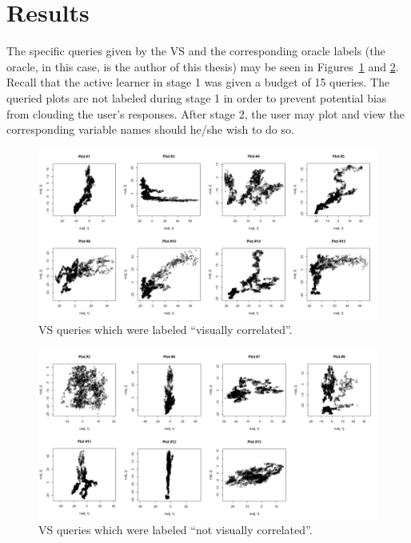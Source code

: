 \section{Results}
\label{sec:usage:results}

The specific queries given by the VS and the corresponding oracle labels 
(the oracle, in this case, is the author of this thesis) may be seen in 
Figures~\ref{fig:usage:interesting} and \ref{fig:usage:notinteresting}. Recall 
that the active learner in stage 1 was given a budget of 15 queries. The 
queried plots are not labeled during stage 1 in order to prevent potential bias 
from clouding the user's responses. After stage 2, the user may plot and view 
the corresponding variable names should he/she wish to do so.
 
\begin{figure}[htb]
	\begin{center}
		\includegraphics[width=1\linewidth]{ch-usage/figures/y_all}
		\caption[VS queries which were labeled ``visually correlated''.]{VS 
		queries which were labeled ``visually correlated''.}
		\label{fig:usage:interesting}
	\end{center}
\end{figure}

\tablespacing
\begin{figure}[H]
	\begin{center}
		\includegraphics[width=1\linewidth]{ch-usage/figures/n_all}
		\caption[VS queries which were labeled ``not visually correlated''.]{VS 
		queries which were labeled ``not visually correlated''.}
		\label{fig:usage:notinteresting}
	\end{center}
\end{figure}
\bodyspacing

